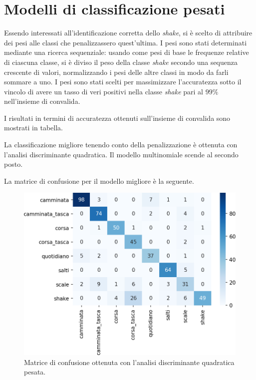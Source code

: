 \documentclass[main.tex]{subfiles}
\begin{document}
\section{Modelli di classificazione pesati}

Essendo interessati all\rq{}identificazione corretta dello {\em shake}, si è scelto di attribuire dei pesi alle classi che penalizzassero quest\rq{}ultima. I pesi sono stati determinati mediante una ricerca sequenziale: usando come pesi di base le frequenze relative di ciascuna classe, si è diviso il peso della classe {\em shake} secondo una sequenza crescente di valori, normalizzando i pesi delle altre classi in modo da farli sommare a uno. I pesi sono stati scelti per massimizzare l\rq{}accuratezza sotto il vincolo di avere un tasso di veri positivi nella classe {\em shake} pari al $99\%$ nell\rq{}insieme di convalida.

I risultati in termini di accuratezza ottenuti sull\rq{}insieme di convalida sono mostrati in tabella.


La classificazione migliore tenendo conto della penalizzazione è ottenuta con l\rq{}analisi discriminante quadratica. Il modello multinomiale scende al secondo posto.

La matrice di confusione per il modello migliore è la seguente.
\begin{figure}[H]
	\centering
	\includegraphics[width=.5\textwidth]{../../figure/confusionMatrix-QDA-penalizzata.png}
	\caption{Matrice di confusione ottenuta con l'analisi discriminante quadratica pesata.}
	\label{fig:qda_pen}
\end{figure}
\end{document}

